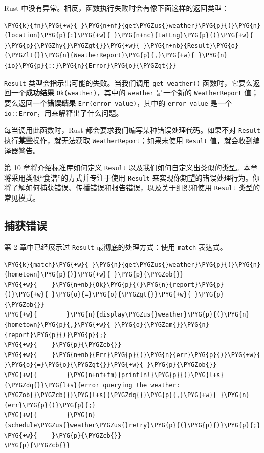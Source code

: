 Rust 中没有异常。相反，函数执行失败时会有像下面这样的返回类型：

\begin{Verbatim}[commandchars=\\\{\},breaklines=true,breakanywhere=true,fontsize=\codefont,xleftmargin=17bp]
\PYG{k}{fn}\PYG{+w}{ }\PYG{n+nf}{get\PYGZus{}weather}\PYG{p}{(}\PYG{n}{location}\PYG{p}{:}\PYG{+w}{ }\PYG{n+nc}{LatLng}\PYG{p}{)}\PYG{+w}{ }\PYG{p}{\PYGZhy{}\PYGZgt{}}\PYG{+w}{ }\PYG{n+nb}{Result}\PYG{o}{\PYGZlt{}}\PYG{n}{WeatherReport}\PYG{p}{,}\PYG{+w}{ }\PYG{n}{io}\PYG{p}{::}\PYG{n}{Error}\PYG{o}{\PYGZgt{}}
\end{Verbatim}

\texttt{Result} 类型会指示出可能的失败。当我们调用 \texttt{get\_weather()} 函数时，它要么返回一个\textbf{成功结果} \texttt{Ok(weather)}，其中的 \texttt{weather} 是一个新的 \texttt{WeatherReport} 值；要么返回一个\textbf{错误结果} \texttt{Err(error\_value)}，其中的 \texttt{error\_value} 是一个 \texttt{io::Error}，用来解释出了什么问题。

每当调用此函数时，Rust 都会要求我们编写某种错误处理代码。如果不对 \texttt{Result} 执行\textbf{某些}操作，就无法获取 \texttt{WeatherReport}；如果未使用 \texttt{Result} 值，就会收到编译器警告。

第 10 章将介绍标准库如何定义 \texttt{Result} 以及我们如何自定义出类似的类型。本章将采用类似“食谱”的方式并专注于使用 \texttt{Result} 来实现你期望的错误处理行为。你将了解如何捕获错误、传播错误和报告错误，以及关于组织和使用 \texttt{Result} 类型的常见模式。

\subsection{捕获错误}

第 2 章中已经展示过 \texttt{Result} 最彻底的处理方式：使用 \texttt{match} 表达式。

\begin{Verbatim}[commandchars=\\\{\},breaklines=true,breakanywhere=true,fontsize=\codefont,xleftmargin=17bp]
\PYG{k}{match}\PYG{+w}{ }\PYG{n}{get\PYGZus{}weather}\PYG{p}{(}\PYG{n}{hometown}\PYG{p}{)}\PYG{+w}{ }\PYG{p}{\PYGZob{}}
\PYG{+w}{    }\PYG{n+nb}{Ok}\PYG{p}{(}\PYG{n}{report}\PYG{p}{)}\PYG{+w}{ }\PYG{o}{=}\PYG{o}{\PYGZgt{}}\PYG{+w}{ }\PYG{p}{\PYGZob{}}
\PYG{+w}{        }\PYG{n}{display\PYGZus{}weather}\PYG{p}{(}\PYG{n}{hometown}\PYG{p}{,}\PYG{+w}{ }\PYG{o}{\PYGZam{}}\PYG{n}{report}\PYG{p}{)}\PYG{p}{;}
\PYG{+w}{    }\PYG{p}{\PYGZcb{}}
\PYG{+w}{    }\PYG{n+nb}{Err}\PYG{p}{(}\PYG{n}{err}\PYG{p}{)}\PYG{+w}{ }\PYG{o}{=}\PYG{o}{\PYGZgt{}}\PYG{+w}{ }\PYG{p}{\PYGZob{}}
\PYG{+w}{        }\PYG{n+nf+fm}{println!}\PYG{p}{(}\PYG{l+s}{\PYGZdq{}}\PYG{l+s}{error querying the weather: \PYGZob{}\PYGZcb{}}\PYG{l+s}{\PYGZdq{}}\PYG{p}{,}\PYG{+w}{ }\PYG{n}{err}\PYG{p}{)}\PYG{p}{;}
\PYG{+w}{        }\PYG{n}{schedule\PYGZus{}weather\PYGZus{}retry}\PYG{p}{(}\PYG{p}{)}\PYG{p}{;}
\PYG{+w}{    }\PYG{p}{\PYGZcb{}}
\PYG{p}{\PYGZcb{}}
\end{Verbatim}

